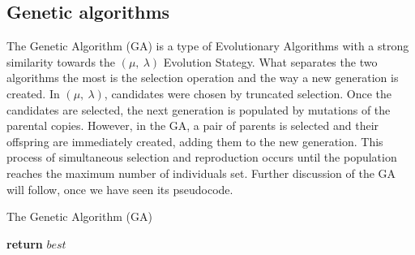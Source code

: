 \subsection{Genetic algorithms}

The Genetic Algorithm (GA) \cite{luke13metaheuristics} is a type of Evolutionary Algorithms with a strong similarity towards the $(\mu,\ \lambda)$ Evolution Stategy. What separates the two algorithms the most is the selection operation and the way a new generation is created. In $(\mu,\ \lambda)$, candidates were chosen by truncated selection. Once the candidates are selected, the next generation is populated by mutations of the parental copies. However, in the GA, a pair of parents is selected and their offspring are immediately created, adding them to the new generation. This process of simultaneous selection and reproduction occurs until the population reaches the maximum number of individuals set. Further discussion of the GA will follow, once we have seen its pseudocode.

\begin{algorithm}[H]
    \caption{The Genetic Algorithm (GA)}
    \begin{algorithmic}[1]
            \EndFor
                    \EndIf
                \EndFor
                 
                \EndFor
            \EndWhile
            \State \textbf{return} $best$
        \EndProcedure
    \end{algorithmic}
\end{algorithm}


